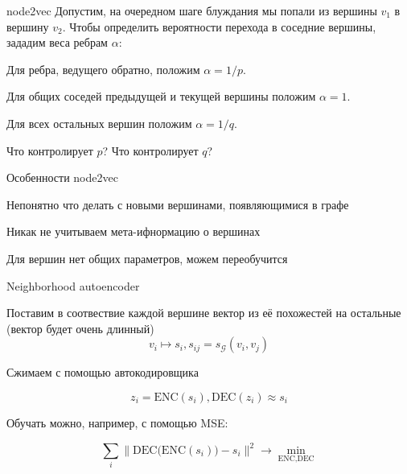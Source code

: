 \documentclass[notes,12pt, aspectratio=169]{beamer}
\newenvironment{wideitemize}{\itemize\addtolength{\itemsep}{10pt}}{\enditemize}
\newcommand{\ENC}{\text{ENC}}
\newcommand{\DEC}{\text{DEC}}
\begin{document}
\begin{frame}{node2vec}
	Допустим, на очередном шаге блуждания мы попали из вершины $v_1$ в вершину $v_2$. Чтобы определить вероятности перехода в соседние вершины, зададим веса ребрам $\alpha$:

	\begin{wideitemize}
		\item  Для ребра, ведущего обратно, положим $\alpha = 1/p$.
		
		\item  Для общих соседей предыдущей и текущей вершины положим $\alpha=1$.
		
		\item Для всех остальных вершин положим $\alpha = 1/q$.
		
		\item  \alert{Что контролирует $p$?}   \alert{Что контролирует $q$?} 
 	\end{wideitemize}
\end{frame}


\begin{frame}{Особенности node2vec}
	\begin{wideitemize}
		\item  Непонятно что делать с новыми вершинами, появляющимися в графе
		\item  Никак не учитываем мета-ифнормацию о вершинах
		\item  Для вершин нет общих параметров, можем переобучится
	\end{wideitemize}
\end{frame}



\begin{frame}{Neighborhood autoencoder}
	\begin{wideitemize}
		\item  Поставим в соотвествие каждой вершине вектор из её похожестей на остальные  (вектор будет очень длинный)
		\[ v_i \mapsto s_i, s_{ij} = s_{\mathcal{G}}(v_i, v_j) \]
		
		\item  Сжимаем с помощью автокодировщика
		
		\[z_i = \ENC(s_i), \DEC(z_i) \approx s_i\] 
		
		
		\item Обучать можно, например, с помощью MSE: 
		
		\[ \sum_{i} \Big\|\DEC\big(\ENC(s_i)\big) - s_i\Big\|^2 \to \min_{\ENC, \DEC} \]
	\end{wideitemize}
\end{frame}
\end{document}
